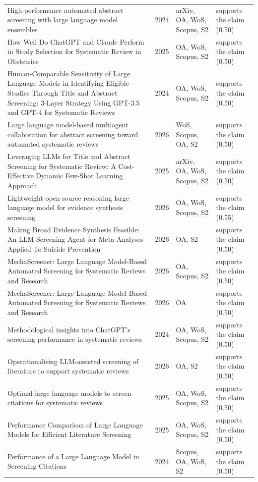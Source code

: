 \begin{longtable}{@{}%
  >{\raggedright\arraybackslash}p{}c%
  >{\raggedright\arraybackslash}p{}%
  >{\raggedright\arraybackslash}p{}@{}}
High-performance automated abstract screening with large language model ensembles & 2024 & arXiv, OA, WoS, Scopus, S2 & supports the claim (0.50) \\
How Well Do ChatGPT and Claude Perform in Study Selection for Systematic Review in Obstetrics & 2025 & OA, WoS, Scopus, S2 & supports the claim (0.50) \\
Human-Comparable Sensitivity of Large Language Models in Identifying Eligible Studies Through Title and Abstract Screening: 3-Layer Strategy Using GPT-3.5 and GPT-4 for Systematic Reviews & 2024 & OA, WoS, Scopus, S2 & supports the claim (0.50) \\
Large language model-based multiagent collaboration for abstract screening toward automated systematic reviews & 2026 & WoS, Scopus, OA, S2 & supports the claim (0.50) \\
Leveraging LLMs for Title and Abstract Screening for Systematic Review: A Cost-Effective Dynamic Few-Shot Learning Approach & 2025 & arXiv, OA, WoS, Scopus, S2 & supports the claim (0.50) \\
Lightweight open-source reasoning large language model for evidence synthesis screening & 2026 & OA, WoS, Scopus, S2 & supports the claim (0.55) \\
Making Broad Evidence Synthesis Feasible: An LLM Screening Agent for Meta-Analyses Applied To Suicide Prevention & 2026 & OA, S2 & supports the claim (0.50) \\
MechaScreener: Large Language Model-Based Automated Screening for Systematic Reviews and Research & 2026 & OA, Scopus, S2 & supports the claim (0.50) \\
MechaScreener: Large Language Model-Based Automated Screening for Systematic Reviews and Research & 2026 & OA & supports the claim (0.50) \\
Methodological insights into ChatGPT's screening performance in systematic reviews & 2024 & OA, WoS, Scopus, S2 & supports the claim (0.50) \\
Operationalising LLM-assisted screening of literature to support systematic reviews & 2026 & OA, S2 & supports the claim (0.50) \\
Optimal large language models to screen citations for systematic reviews & 2025 & OA, WoS, Scopus, S2 & supports the claim (0.50) \\
Performance Comparison of Large Language Models for Efficient Literature Screening & 2025 & OA, WoS, Scopus, S2 & supports the claim (0.50) \\
Performance of a Large Language Model in Screening Citations & 2024 & Scopus, OA, WoS, S2 & supports the claim (0.50) \\

\end{longtable}
